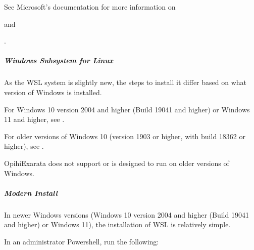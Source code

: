 \documentclass[letterpaper,11pt,english]{sphinxmanual}
\begin{document}
\begin{sphinxVerbatim}[commandchars=\\\{\}]
  
\end{sphinxVerbatim}

\sphinxAtStartPar
See Microsoft’s documentation for more information on
%
\begin{footnote}[30]\sphinxAtStartFootnote
{}
%
\end{footnote} and %
\begin{footnote}[31]\sphinxAtStartFootnote
{}
%
\end{footnote}.


\subparagraph{Windows Subsystem for Linux}
\label{\detokenize{technical/installation/windows:windows-subsystem-for-linux}}
\sphinxAtStartPar
As the WSL system is slightly new, the steps to install it differ based on
what version of Windows is installed.

\sphinxAtStartPar
For Windows 10 version 2004 and higher (Build 19041 and higher) or Windows 11
and higher, see {\hyperref[\detokenize{technical/installation/windows:modern-install}]{}}.

\sphinxAtStartPar
For older versions of Windows 10 (version 1903 or higher, with build 18362 or
higher), see {\hyperref[\detokenize{technical/installation/windows:manual-install}]{}}.

\sphinxAtStartPar
OpihiExarata does not support or is designed to run on older versions of
Windows.


\subparagraph{Modern Install}
\label{\detokenize{technical/installation/windows:modern-install}}
\sphinxAtStartPar
In newer Windows versions (Windows 10 version 2004 and higher (Build 19041
and higher) or Windows 11), the installation of WSL is relatively simple.

\sphinxAtStartPar
In an administrator Powershell, run the following:
\end{document}
